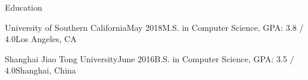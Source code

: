 \documentclass{resume} %
\begin{document}



\begin{rSection}{Education}

\begin{rEducation}{University of Southern California}{May 2018}{M.S. in Computer Science, GPA: 3.8 / 4.0}{Los Angeles, CA}
\end{rEducation}

\begin{rEducation}{Shanghai Jiao Tong University}{June 2016}{B.S. in Computer Science, GPA: 3.5 / 4.0}{Shanghai, China}
\end{rEducation}

\end{rSection}

\end{document}
